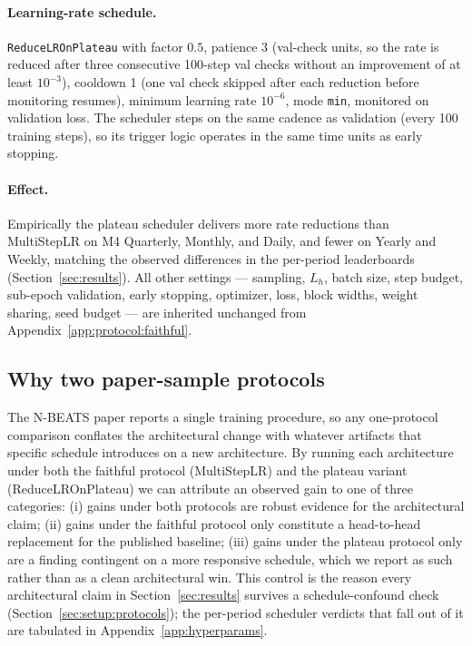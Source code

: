 \paragraph{Learning-rate schedule.} \texttt{ReduceLROnPlateau} with factor
$0.5$, patience 3 (val-check units, so the rate is reduced after three
consecutive 100-step val checks without an improvement of at least
$10^{-3}$), cooldown 1 (one val check skipped after each reduction before
monitoring resumes), minimum learning rate $10^{-6}$, mode \texttt{min},
monitored on validation loss. The scheduler steps on the same cadence as
validation (every 100 training steps), so its trigger logic operates in the
same time units as early stopping.

\paragraph{Effect.} Empirically the plateau scheduler delivers more rate
reductions than MultiStepLR on M4 Quarterly, Monthly, and Daily, and fewer
on Yearly and Weekly, matching the observed differences in the per-period
leaderboards (Section~\ref{sec:results}). All other settings --- sampling,
$L_h$, batch size, step budget, sub-epoch validation, early stopping,
optimizer, loss, block widths, weight sharing, seed budget --- are inherited
unchanged from Appendix~\ref{app:protocol:faithful}.

\subsection{Why two paper-sample protocols}
\label{app:protocol:why}

The N-BEATS paper reports a single training procedure, so any one-protocol
comparison conflates the architectural change with whatever artifacts that
specific schedule introduces on a new architecture. By running each
architecture under both the faithful protocol (MultiStepLR) and the plateau
variant (ReduceLROnPlateau) we can attribute an observed gain to one of
three categories: (i) gains under both protocols are robust evidence for
the architectural claim; (ii) gains under the faithful protocol only
constitute a head-to-head replacement for the published baseline; (iii)
gains under the plateau protocol only are a finding contingent on a more
responsive schedule, which we report as such rather than as a clean
architectural win. This control is the reason every architectural claim in
Section~\ref{sec:results} survives a schedule-confound check
(Section~\ref{sec:setup:protocols}); the per-period scheduler verdicts that
fall out of it are tabulated in Appendix~\ref{app:hyperparams}.

